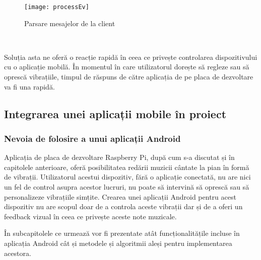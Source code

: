 \documentclass[../IoMusT.tex]{subfiles}
\begin{document}
\begin{figure}[h]
\centering
\texttt{[image: processEv]}
\caption{Parsare mesajelor de la client}
\label{fig:processEv}
\end{figure} 
\\
\par Soluția asta ne oferă o reacție rapidă în ceea ce privește controlarea dispozitivului cu o aplicație mobilă. În momentul în care utilizatorul dorește să regleze sau să oprescă vibrațiile, timpul de răspuns de către aplicația de pe placa de dezvoltare va fi una rapidă. 
\subsection{Integrarea unei aplicații mobile în proiect}
\subsubsection{Nevoia de folosire a unui aplicații Android}
Aplicația de placa de dezvoltare Raspberry Pi, după cum s-a discutat și în capitolele anterioare, oferă posibilitatea redării muzicii cântate la pian în formă de vibrații. Utilizatorul acestui dispozitiv, fără o aplicație conectată, nu are nici un fel de control asupra acestor lucruri, nu poate să intervină să oprescă sau să personalizeze vibrațiile simțite. Crearea unei aplicații Android pentru acest dispozitiv nu are scopul doar de a controla aceste vibrații dar și de a oferi un feedback vizual în ceea ce privește aceste note muzicale. 
\\
\par În subcapitolele ce urmează vor fi prezentate atât funcționalitățile incluse în aplicația Android cât și metodele și algoritmii aleși pentru implementarea acestora.
\end{document}
